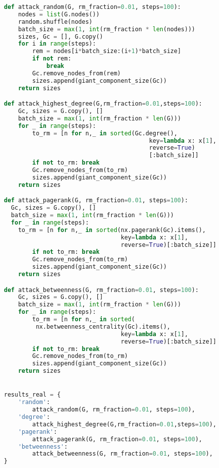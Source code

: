 \documentclass{article}
\begin{document}
\begin{lstlisting}[language=Python, caption={Attack strategies.}]
def attack_random(G, rm_fraction=0.01, steps=100):
    nodes = list(G.nodes())
    random.shuffle(nodes)
    batch_size = max(1, int(rm_fraction * len(nodes)))
    sizes, Gc = [], G.copy()
    for i in range(steps):
        rem = nodes[i*batch_size:(i+1)*batch_size]
        if not rem:
            break
        Gc.remove_nodes_from(rem)
        sizes.append(giant_component_size(Gc))
    return sizes

def attack_highest_degree(G,rm_fraction=0.01,steps=100):
    Gc, sizes = G.copy(), []
    batch_size = max(1, int(rm_fraction * len(G)))
    for _ in range(steps):
        to_rm = [n for n,_ in sorted(Gc.degree(),
                                         key=lambda x: x[1],
                                         reverse=True)
                                         [:batch_size]]
        if not to_rm: break
        Gc.remove_nodes_from(to_rm)
        sizes.append(giant_component_size(Gc))
    return sizes

def attack_pagerank(G, rm_fraction=0.01, steps=100):
  Gc, sizes = G.copy(), []
  batch_size = max(1, int(rm_fraction * len(G)))
  for _ in range(steps):
    to_rm = [n for n,_ in sorted(nx.pagerank(Gc).items(),
                                 key=lambda x: x[1],
                                 reverse=True)[:batch_size]]
        if not to_rm: break
        Gc.remove_nodes_from(to_rm)
        sizes.append(giant_component_size(Gc))
    return sizes

def attack_betweenness(G, rm_fraction=0.01, steps=100):
    Gc, sizes = G.copy(), []
    batch_size = max(1, int(rm_fraction * len(G)))
    for _ in range(steps):
        to_rm = [n for n,_ in sorted(
         nx.betweenness_centrality(Gc).items(),
                                 key=lambda x: x[1],
                                 reverse=True)[:batch_size]]
        if not to_rm: break
        Gc.remove_nodes_from(to_rm)
        sizes.append(giant_component_size(Gc))
    return sizes


results_real = {
    'random':
        attack_random(G, rm_fraction=0.01, steps=100),
    'degree':
        attack_highest_degree(G,rm_fraction=0.01,steps=100),
    'pagerank':
        attack_pagerank(G, rm_fraction=0.01, steps=100),
    'betweenness':
        attack_betweenness(G, rm_fraction=0.01, steps=100),
}
\end{lstlisting}
\end{document}
